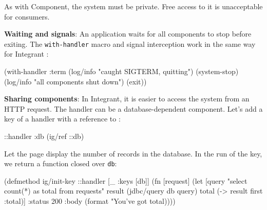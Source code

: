 \fi

As with Component, the system must be private. Free access to it is unacceptable for consumers.


\textbf{Waiting and signals}: An application waits for all components to stop before exiting. The \verb|with-handler| macro and signal interception work in the same way for Integrant :

\begin{english}
  \begin{clojure}
(with-handler :term
  (log/info "caught SIGTERM, quitting")
  (system-stop)
  (log/info "all components shut down")
  (exit))
  \end{clojure}
\end{english}


\textbf{Sharing components}: In Integrant, it is easier to access the system from an HTTP request. The handler can be a database-dependent component. Let's add a key of a handler with a reference to :

\begin{english}
  \begin{clojure}
{::handler {:db (ig/ref ::db)}}
  \end{clojure}
\end{english}

Let the page display the number of records in the database. In the run of the key, we return a function closed over \verb|db|:

\ifnarrow

\begin{english}
  \begin{clojure}
(defmethod ig/init-key ::handler
  [_ {:keys [db]}]
  (fn [request]
    (let [query "select count(*) as total
                 from requests"
          result (jdbc/query db query)
          total (-> result first :total)]
      {:status 200
       :body (format
               "You've got %
               total)})))
  \end{clojure}
\end{english}

\else

\begin{english}
\end{english}

